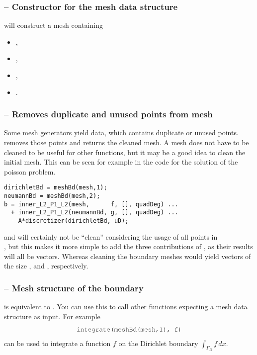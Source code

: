 \documentclass[twoside,11pt,a4paper]{article} %
\begin{document}
\subsubsection*{\texorpdfstring{ --}{} Constructor for the mesh data structure}
 will construct a mesh containing
\begin{itemize}[noitemsep]
 \item {},
 \item {},
 \item {},
 \item {}.
\end{itemize}
\subsubsection*{\texorpdfstring{ --}{} Removes duplicate and unused points from mesh}
Some mesh generators yield data, which contains duplicate or unused points. \\
 removes those points and returns the cleaned mesh.
A mesh does not have to be cleaned to be useful for other functions, but it may be a good idea to clean the initial mesh. This can be seen for example in the code for the solution of the poisson problem.
\begin{lstlisting}[caption={Excerpt from \mcode{solvePoisson}}]
dirichletBd = meshBd(mesh,1);
neumannBd = meshBd(mesh,2);
b = inner_L2_P1_L2(mesh,      f, [], quadDeg) ...
  + inner_L2_P1_L2(neumannBd, g, [], quadDeg) ...
  - A*discretizer(dirichletBd, uD);
\end{lstlisting}
 and  will certainly not be \enquote{clean} considering the usage of all points in 
\\ , but this makes it more simple to add the three contributions of , as their results will all be  vectors. Whereas cleaning the boundary meshes would yield vectors of the size 
,  and , respectively.

\subsubsection*{\texorpdfstring{ --}{} Mesh structure of the boundary}
 is equivalent to . You can use this to call other functions expecting a mesh data structure as input. For example
\begin{align*}
\text{\mcode{integrate(meshBd(mesh,1), f)}}
\end{align*}can be used to integrate a function $f$ on the Dirichlet boundary $\int_{\Gamma_D} f \,dx$.
\end{document}
